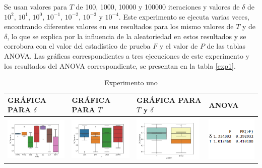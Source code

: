 Se usan valores para $T$ de 100, 1000, 10000 y 100000 iteraciones y valores de $\delta$ de $10^{2}$, $10^{1}$, $10^{0}$, $10^{-1}$, $10^{-2}$, $10^{-3}$ y $10^{-4}$. Este experimento se ejecuta varias veces, encontrando diferentes valores en sus resultados para los mismo valores de $T$ y de $\delta$, lo que se explica por la influencia de la aleatoriedad en estos resultados y se corrobora con el valor del estadístico de prueba $F$ y el valor de $P$ de las tablas ANOVA. Las gráficas correspondientes a tres ejecuciones de este experimento y los resultados del ANOVA correspondiente, se presentan en la tabla \ref{exp1}.
\begin{table}[H]
\caption{Experimento uno}
\centering
\begin{tabular}[c]{llll}
\multicolumn{1}{p{2.9cm}}{\textbf{GRÁFICA PARA $\delta$}} & \multicolumn{1}{p{2.9cm}}{\textbf{GRÁFICA PARA $T$}} & \multicolumn{1}{p{2.9cm}}{\textbf{GRÁFICA PARA $T$ y $\delta$}} & \multicolumn{1}{p{2.9cm}}{\textbf{ANOVA}}  \\ \hline
\multicolumn{1}{|l|}{\includegraphics[align=t, width=33mm]{cajasDeltha_exp11.jpg}}    & \multicolumn{1}{l|}{\includegraphics[align=t, width=33mm]{cajasT1_exp11.jpg} } & \multicolumn{1}{l|}{\includegraphics[align=t, width=33mm]{cajasT_Deltha_exp11.jpg} } &
\multicolumn{1}{p{3cm}|}{\includegraphics[align=t, width=30mm]{Anova11.png}}     \\ \hline

\end{tabular}
\end{table}
